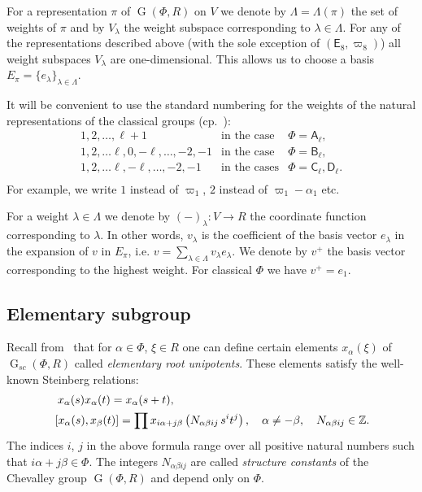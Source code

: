 \documentclass[12pt]{amsart}
\numberwithin{equation}{section}
\theoremstyle{definition}
\DeclareMathOperator{\G}{G}
\newcommand{\rA}{\mathsf{A}}
\newcommand{\rB}{\mathsf{B}}
\newcommand{\rC}{\mathsf{C}}
\newcommand{\rD}{\mathsf{D}}
\newcommand{\rE}{\mathsf{E}}
\begin{document}
For a representation $\pi$ of $\G(\Phi, R)$ on $V$ we denote by $\Lambda=\Lambda(\pi)$ the set of weights of $\pi$ and by $V_\lambda$ the weight subspace corresponding to $\lambda\in\Lambda$.
For any of the representations described above (with the sole exception of $(\rE_8, \varpi_8)$) all weight subspaces $V_\lambda$ are one-dimensional. 
This allows us to choose a basis $E_\pi=\{e_\lambda\}_{\lambda\in\Lambda}$.

It will be convenient to use the standard numbering for the weights of the natural representations of the classical groups (cp.~\cite[§1B]{St78}):
\[\begin{array}{cll}
  1,2,\ldots, \ell+1 & \text{in the case} & \Phi =\rA_\ell, \\
  1,2,\ldots \ell, 0, -\ell,\ldots, -2, -1 & \text{in the case} & \Phi =\rB_\ell, \\
  1,2,\ldots \ell, -\ell,\ldots, -2, -1 & \text{in the cases}   & \Phi =\rC_\ell, \rD_\ell. \\
\end{array}\]
For example, we write $1$ instead of $\varpi_1$, $2$ instead of $\varpi_1-\alpha_1$ etc.

For a weight $\lambda\in \Lambda$ we denote by $(-)_\lambda\colon V\to R$ the coordinate function corresponding to $\lambda$.
In other words,  $v_\lambda$ is the coefficient of the basis vector $e_\lambda$ in the expansion of $v$ in $E_\pi$, i.e. $v=\sum_{\lambda\in \Lambda} v_\lambda e_\lambda$.
We denote by $v^+$ the basis vector corresponding to the highest weight.
For classical $\Phi$ we have $v^+=e_1$.

\subsection{Elementary subgroup}\label{sec:elementary}
Recall from~\cite{St78, VP} that for $\alpha\in \Phi$, $\xi\in R$ one can define certain elements $x_{\alpha}(\xi)$ of $\G_{sc}(\Phi, R)$ called {\it elementary root unipotents}.
These elements satisfy the well-known Steinberg relations:
\begin{align}
& \phantom{\left[{}\vphantom{x_\beta(t)}\right.}
x_\alpha(s) x_\alpha(t) = x_\alpha(s+t), \label{rel:add}\\
& \left[x_\alpha(s),  x_\beta(t)\right] = \prod x_{i\alpha + j\beta}\left(N_{\alpha\beta ij}\, s^i t^j\right),\quad \alpha\neq-\beta, \quad N_{\alpha\beta ij}\in\mathbb{Z}. \label{rel:CCF}
\end{align} 
The indices $i$, $j$ in the above formula range over all positive natural numbers such that $i\alpha + j\beta\in\Phi$.
The integers $N_{\alpha\beta ij}$ are called {\it structure constants} of the Chevalley group $\G(\Phi,R)$ and depend only on $\Phi$.
\end{document}
